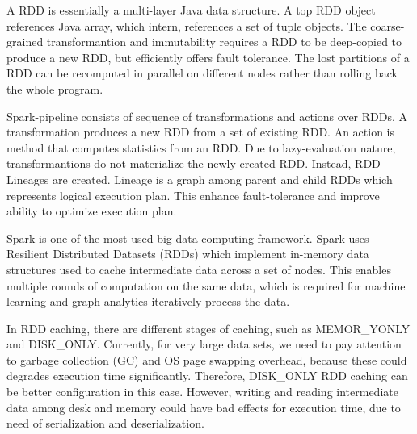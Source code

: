 A RDD is essentially a multi-layer Java data structure. A top RDD object references Java array, which intern, references a set of tuple objects. 
The coarse-grained transformantion and immutability requires a RDD to be deep-copied to produce a new RDD, but efficiently offers fault tolerance. 
The lost partitions of a RDD can be recomputed in parallel on different nodes rather than rolling back the whole program.

Spark-pipeline consists of sequence of transformations and actions over RDDs. A transformation produces a new RDD from a set of existing RDD. 
An action is method that computes statistics from an RDD. Due to lazy-evaluation nature, transformantions do not materialize the newly created RDD. 
Instead, RDD Lineages are created. Lineage is a graph among parent and child RDDs which represents logical execution plan. 
This enhance fault-tolerance and improve ability to optimize execution plan. 








Spark is one of the most used big data computing framework. Spark uses Resilient Distributed Datasets (RDDs) which implement in-memory data structures 
used to cache intermediate data across a set of nodes. This enables multiple rounds of computation on the same data, which is required for machine learning 
and graph analytics iteratively process the data. 

In RDD caching, there are different stages of caching, such as MEMOR\_YONLY and DISK\_ONLY. 
Currently, for very large data sets, we need to pay attention to garbage collection (GC) and OS page swapping overhead, 
because these could degrades execution time significantly. Therefore, DISK\_ONLY RDD caching can be better configuration in this case. 
However, writing and reading intermediate data among desk and memory could have bad effects for execution time, due to need of serialization and deserialization. 
